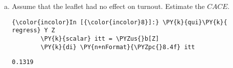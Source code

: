\documentclass[11pt,notitlepage]{article}\usepackage[]{graphicx}\usepackage[]{color}
\makeatletter
\newenvironment{kframe}{%
 \def\at@end@of@kframe{}%
 \ifinner\ifhmode%
  \def\at@end@of@kframe{\end{minipage}}%
  \begin{minipage}{\columnwidth}%
 \fi\fi%
 \def\FrameCommand##1{\hskip\@totalleftmargin \hskip-\fboxsep
 \colorbox{shadecolor}{##1}\hskip-\fboxsep
     \hskip-\linewidth \hskip-\@totalleftmargin \hskip\columnwidth}%
 \MakeFramed {\advance\hsize-\width
   \@totalleftmargin\z@ \linewidth\hsize
   \@setminipage}}%
 {\par\unskip\endMakeFramed%
 \at@end@of@kframe}
\newenvironment{knitrout}{}{} %
\makeatother
\begin{document}
\begin{enumerate}[a)]
\begin{knitrout}
\begin{kframe}
\begin{Verbatim}[commandchars=\\\{\}]
    \end{Verbatim}

    \begin{Verbatim}[commandchars=\\\{\}]
{\color{incolor}In [{\color{incolor}6}]:} \PY{c+c1}{//}\PY{c+c1}{ }\PY{c+c1}{i}\PY{c+c1}{t}\PY{c+c1}{t}
        \PY{k}{di} \PY{n+nFormat}{\PYZpc{}8.4f} \PY{n+nf}{el}(\PY{n+nf}{r}(b),\PY{l+m}{1},\PY{l+m}{1})
\end{Verbatim}

    \begin{Verbatim}[commandchars=\\\{\}]
  0.1319

    \end{Verbatim}

    \begin{Verbatim}[commandchars=\\\{\}]
{\color{incolor}In [{\color{incolor}7}]:} \PY{c+c1}{//}\PY{c+c1}{ }\PY{c+c1}{p}\PY{c+c1}{.}\PY{c+c1}{v}\PY{c+c1}{a}\PY{c+c1}{l}\PY{c+c1}{u}\PY{c+c1}{e}\PY{c+c1}{.}\PY{c+c1}{t}\PY{c+c1}{w}\PY{c+c1}{o}\PY{c+c1}{s}\PY{c+c1}{i}\PY{c+c1}{d}\PY{c+c1}{e}\PY{c+c1}{d}
        \PY{k}{di} \PY{n+nFormat}{\PYZpc{}8.0f} \PY{n+nf}{el}(\PY{n+nf}{r}(p),\PY{l+m}{1},\PY{l+m}{1})
\end{Verbatim}

    \begin{Verbatim}[commandchars=\\\{\}]
       0
    \end{Verbatim}
\end{kframe}
\end{knitrout}

\item Assume that the leaflet had no effect on turnout. Estimate the $CACE$.
\begin{knitrout}
\color{fgcolor}\begin{kframe}
    \begin{Verbatim}[commandchars=\\\{\}]
{\color{incolor}In [{\color{incolor}8}]:} \PY{k}{qui}\PY{k}{ regress} Y Z
        \PY{k}{scalar} itt = \PYZus{}b[Z]
        \PY{k}{di} \PY{n+nFormat}{\PYZpc{}8.4f} itt
\end{Verbatim}

    \begin{Verbatim}[commandchars=\\\{\}]
  0.1319
    \end{Verbatim}


\end{kframe}
\end{knitrout}
\end{enumerate}
\end{document}
